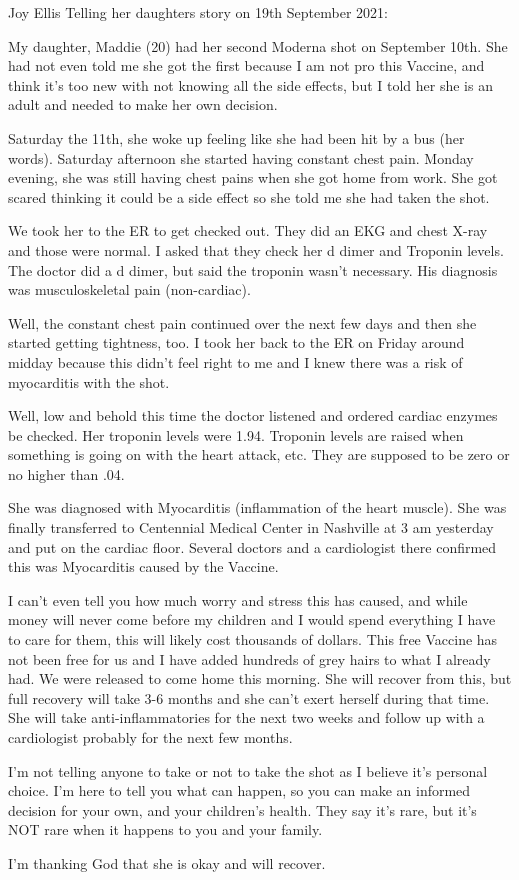 Joy Ellis Telling her daughters story on 19th September 2021:

My daughter, Maddie (20) had her second Moderna shot on September 10th. She had
not even told me she got the first because I am not pro this Vaccine, and think
it’s too new with not knowing all the side effects, but I told her she is an
adult and needed to make her own decision.

Saturday the 11th, she woke up feeling like she had been hit by a bus (her
words). Saturday afternoon she started having constant chest pain. Monday
evening, she was still having chest pains when she got home from work. She got
scared thinking it could be a side effect so she told me she had taken the shot.

We took her to the ER to get checked out. They did an EKG and chest X-ray and
those were normal. I asked that they check her d dimer and Troponin levels. The
doctor did a d dimer, but said the troponin wasn’t necessary. His diagnosis was
musculoskeletal pain (non-cardiac).

Well, the constant chest pain continued over the next few days and then she
started getting tightness, too. I took her back to the ER on Friday around
midday because this didn’t feel right to me and I knew there was a risk of
myocarditis with the shot.

Well, low and behold this time the doctor listened and ordered cardiac enzymes
be checked. Her troponin levels were 1.94. Troponin levels are raised when
something is going on with the heart attack, etc. They are supposed to be zero
or no higher than .04.

She was diagnosed with Myocarditis (inflammation of the heart muscle). She was
finally transferred to Centennial Medical Center in Nashville at 3 am yesterday
and put on the cardiac floor. Several doctors and a cardiologist there confirmed
this was Myocarditis caused by the Vaccine.

I can’t even tell you how much worry and stress this has caused, and while money
will never come before my children and I would spend everything I have to care
for them, this will likely cost thousands of dollars. This free Vaccine has not
been free for us and I have added hundreds of grey hairs to what I already
had. We were released to come home this morning. She will recover from this, but
full recovery will take 3-6 months and she can’t exert herself during that
time. She will take anti-inflammatories for the next two weeks and follow up
with a cardiologist probably for the next few months.

I’m not telling anyone to take or not to take the shot as I believe it’s
personal choice. I’m here to tell you what can happen, so you can make an
informed decision for your own, and your children’s health. They say it’s rare,
but it’s NOT rare when it happens to you and your family.

I’m thanking God that she is okay and will recover.

